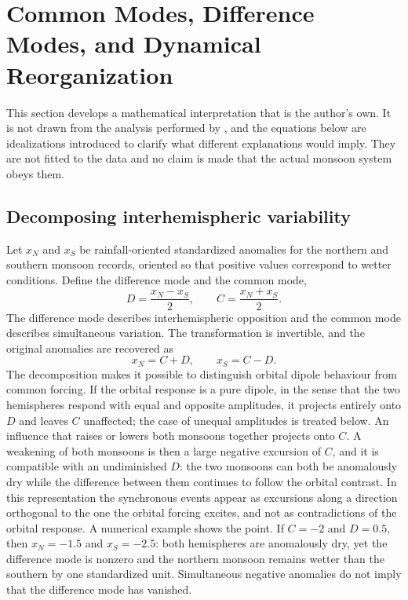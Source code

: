 \documentclass[11pt]{article}
\theoremstyle{definition}
\begin{document}
\section{Common Modes, Difference Modes, and Dynamical Reorganization}

This section develops a mathematical interpretation that is the author's own. It is not drawn from the analysis performed by \citeauthor{olson2026}, and the equations below are idealizations introduced to clarify what different explanations would imply. They are not fitted to the data and no claim is made that the actual monsoon system obeys them.

\subsection{Decomposing interhemispheric variability}

Let $x_N$ and $x_S$ be rainfall-oriented standardized anomalies for the northern and southern monsoon records, oriented so that positive values correspond to wetter conditions. Define the difference mode and the common mode,
\begin{equation}
D = \frac{x_N - x_S}{2}, \qquad C = \frac{x_N + x_S}{2}.
\label{eq:modes}
\end{equation}
The difference mode describes interhemispheric opposition and the common mode describes simultaneous variation. The transformation is invertible, and the original anomalies are recovered as
\begin{equation}
x_N = C + D, \qquad x_S = C - D.
\label{eq:inverse}
\end{equation}
The decomposition makes it possible to distinguish orbital dipole behaviour from common forcing. If the orbital response is a pure dipole, in the sense that the two hemispheres respond with equal and opposite amplitudes, it projects entirely onto $D$ and leaves $C$ unaffected; the case of unequal amplitudes is treated below. An influence that raises or lowers both monsoons together projects onto $C$. A weakening of both monsoons is then a large negative excursion of $C$, and it is compatible with an undiminished $D$: the two monsoons can both be anomalously dry while the difference between them continues to follow the orbital contrast. In this representation the synchronous events appear as excursions along a direction orthogonal to the one the orbital forcing excites, and not as contradictions of the orbital response. A numerical example shows the point. If $C = -2$ and $D = 0.5$, then $x_N = -1.5$ and $x_S = -2.5$: both hemispheres are anomalously dry, yet the difference mode is nonzero and the northern monsoon remains wetter than the southern by one standardized unit. Simultaneous negative anomalies do not imply that the difference mode has vanished.
\end{document}
